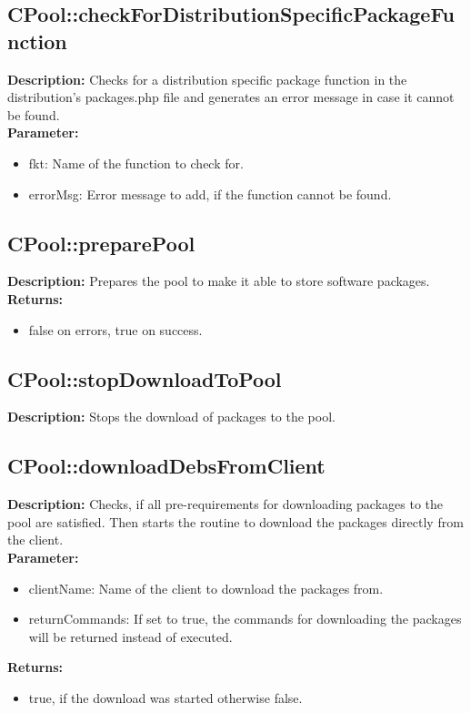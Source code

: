 \subsection{CPool::checkForDistributionSpecificPackageFunction}
\textbf{Description:} Checks for a distribution specific package function in the distribution's packages.php file and generates an error message in case it cannot be found.\\
\textbf{Parameter:}
\begin{itemize}
\item fkt: Name of the function to check for.
\item errorMsg: Error message to add, if the function cannot be found.
\end{itemize}

\subsection{CPool::preparePool}
\textbf{Description:} Prepares the pool to make it able to store software packages.\\
\textbf{Returns:}
\begin{itemize}
\item false on errors, true on success.
\end{itemize}

\subsection{CPool::stopDownloadToPool}
\textbf{Description:} Stops the download of packages to the pool.\\

\subsection{CPool::downloadDebsFromClient}
\textbf{Description:} Checks, if all pre-requirements for downloading packages to the pool are satisfied. Then starts the routine to download the packages directly from the client.\\
\textbf{Parameter:}
\begin{itemize}
\item clientName: Name of the client to download the packages from.
\item returnCommands: If set to true, the commands for downloading the packages will be returned instead of executed.
\end{itemize}
\textbf{Returns:}
\begin{itemize}
\item true, if the download was started otherwise false.
\end{itemize}

